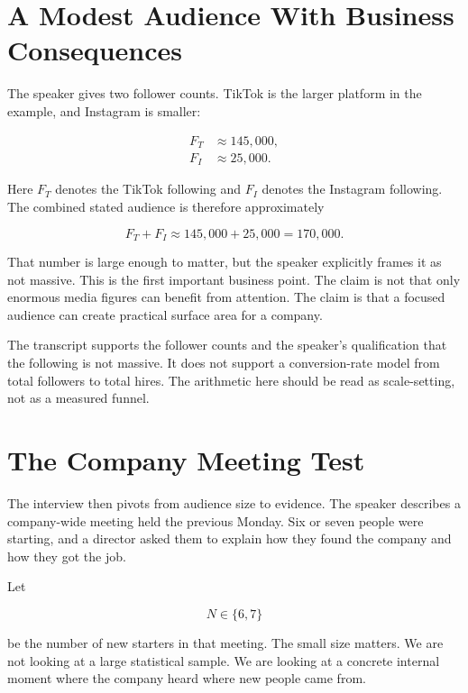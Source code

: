 \section{A Modest Audience With Business Consequences}

The speaker gives two follower counts. TikTok is the larger platform in the example, and Instagram is smaller:

\begin{align}
F_T &\approx 145{,}000,\\
F_I &\approx 25{,}000.
\end{align}

Here \(F_T\) denotes the TikTok following and \(F_I\) denotes the Instagram following. The combined stated audience is therefore approximately

\begin{equation}
F_T + F_I \approx 145{,}000 + 25{,}000 = 170{,}000.
\end{equation}

That number is large enough to matter, but the speaker explicitly frames it as not massive. This is the first important business point. The claim is not that only enormous media figures can benefit from attention. The claim is that a focused audience can create practical surface area for a company.

\begin{remark}
The transcript supports the follower counts and the speaker's qualification that the following is not massive. It does not support a conversion-rate model from total followers to total hires. The arithmetic here should be read as scale-setting, not as a measured funnel.
\end{remark}

\section{The Company Meeting Test}

The interview then pivots from audience size to evidence. The speaker describes a company-wide meeting held the previous Monday. Six or seven people were starting, and a director asked them to explain how they found the company and how they got the job.

Let

\begin{equation}
N \in \{6,7\}
\end{equation}

be the number of new starters in that meeting. The small size matters. We are not looking at a large statistical sample. We are looking at a concrete internal moment where the company heard where new people came from.

